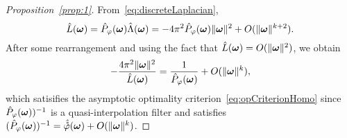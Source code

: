 \begin{proof}[Proposition~\ref{prop:1}]
  From~\eqref{eq:discreteLaplacian},
  \begin{equation*}
    \hat{L}(\boldsymbol{\omega}) =
    \hat{P}_{\varphi}(\boldsymbol{\omega})\hat{\Lambda}(\boldsymbol{\omega}) = -4 \pi^2 \hat{P}_{\varphi}(\boldsymbol{\omega})\lVert\boldsymbol{\omega}\rVert^2 + O(\lVert\boldsymbol{\omega}\rVert^{k+2}).
  \end{equation*}
  After some rearrangement and using the fact that
  $\hat{L}(\boldsymbol{\omega}) = O(\lVert\boldsymbol{\omega}\rVert^2)$, we obtain
  \begin{equation*}
    -\frac{4\pi^2\lVert\boldsymbol{\omega}\rVert^2}{\hat{L}(\boldsymbol{\omega})} 
    = \frac{1}{\hat{P}_{\varphi}(\boldsymbol{\omega})}
    + O(\lVert\boldsymbol{\omega}\rVert^k),
  \end{equation*}
  which satisifies the asymptotic optimality
  criterion~\eqref{eq:opCriterionHomo} since
  $\hat{P}_{\varphi}(\boldsymbol{\omega}))^{-1}$ is a quasi-interpolation
  filter and satisfies $(\hat{P}_{\varphi}(\boldsymbol{\omega}))^{-1}
  = \hat{{\mathring{\varphi}}}(\boldsymbol{\omega}) + O(\lVert\boldsymbol{\omega}\rVert^k)$.
\end{proof}


